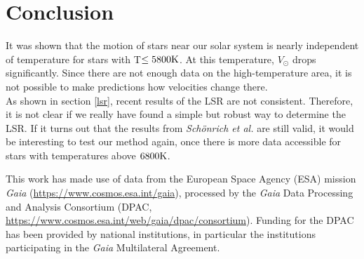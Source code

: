 \documentclass{aastex62}
\begin{document}
	\section{Conclusion}
	\noindent
	It was shown that the motion of stars near our solar system is nearly independent of temperature for stars with T$\leq 5800\rm K$. At this temperature, $V_\odot$ drops significantly. Since there are not enough data on the high-temperature area, it is not possible to make predictions how velocities change there.
	\\
	As shown in section \ref{lsr}, recent results of the LSR are not consistent. Therefore, it is not clear if we really have found a simple but robust way to determine the LSR. If it turns out that the results from \textit{Sch\"onrich et al.} are still valid, it would be interesting to test our method again, once there is more data accessible for stars with temperatures above $6800\rm K$. 

	\acknowledgements
	\noindent
	This work has made use of data from the European Space Agency (ESA) mission
	{\it Gaia} (\url{https://www.cosmos.esa.int/gaia}), processed by the {\it Gaia}
	Data Processing and Analysis Consortium (DPAC,
	\url{https://www.cosmos.esa.int/web/gaia/dpac/consortium}). Funding for the DPAC
	has been provided by national institutions, in particular the institutions
	participating in the {\it Gaia} Multilateral Agreement.
	
	\newpage
	
\end{document}
